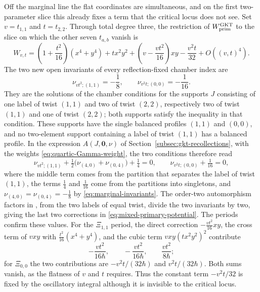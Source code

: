 Off the marginal line the flat coordinates are simultaneous, and on the first
two-parameter slice this already fixes a term that the critical locus does
not see.  Set $v=t_{1,1}$ and $t=t_{2,2}$.  Through total degree three, the
restriction of $W^{\mathrm{GKT}}_{\mathrm{prim}}$ to the slice on which the other
seven $t_{a,b}$ vanish is
\begin{equation}\label{eq:mixed-primary-potential}
 W_{v,t}
 =\left(1+\frac{t^2}{16}\right)(x^4+y^4)
  +tx^2y^2
  +\left(v-\frac{vt^2}{16}\right)xy
  -\frac{v^2t}{32}+O((v,t)^4).
\end{equation}
The two new open invariants of every reflection-fixed chamber index are
\[
 \nu_{vt^2;(1,1)}=-\frac18,
 \qquad
 \nu_{v^2t;(0,0)}=-\frac1{16}.
\]
They are the solutions of the chamber conditions
\cite[Def.~3.47(3)]{grossetal2022open} for the supports $J$ consisting of
one label of twist $(1,1)$ and two of twist $(2,2)$, respectively two of
twist $(1,1)$ and one of twist $(2,2)$; both supports satisfy the
inequality in that condition.  These supports have the single balanced
profiles $(1,1)$ and $(0,0)$, and no two-element support containing a
label of twist $(1,1)$ has a balanced profile.  In the expression
$A(J,\mathbf 0,\nu)$ of Section~\ref{subsec:gkt-recollections}, with the
weights \eqref{eq:quartic-Gamma-weight}, the two conditions therefore read
\[
 \nu_{vt^2;(1,1)}+\tfrac12\bigl(\nu_{(4,0)}+\nu_{(0,4)}\bigr)+\tfrac14=0,
 \qquad
 \nu_{v^2t;(0,0)}+\tfrac1{16}=0,
\]
where the middle term comes from the partition that separates the label
of twist $(1,1)$, the terms $\frac14$ and $\frac1{16}$ come from the
partitions into singletons, and $\nu_{(4,0)}=\nu_{(0,4)}=-\frac18$ by
\eqref{eq:marginal-invariants}.  The order-two automorphism factors in
\cite[(4.11)]{grossetal2022open}, from the two labels of equal twist, divide
the two invariants by two, giving
the last two corrections in \eqref{eq:mixed-primary-potential}.  The
periods confirm these values.  For the $\Xi_{1,1}$ period, the direct
correction $-\frac{vt^2}{16}xy$, the cross term of $vxy$ with
$\frac{t^2}{16}(x^4+y^4)$, and the cubic term $vxy(tx^2y^2)^2$ contribute
\[
 -\frac{vt^2}{16\hbar},\qquad
 -\frac{vt^2}{16\hbar},\qquad
 \frac{vt^2}{8\hbar};
\]
for $\Xi_{0,0}$ the two contributions are
$-v^2t/(32\hbar)$ and $v^2t/(32\hbar)$.  Both sums vanish, as the flatness
of $v$ and $t$ requires.  Thus the constant term $-v^2t/32$ is fixed by the
oscillatory integral although it is invisible to the critical locus.
